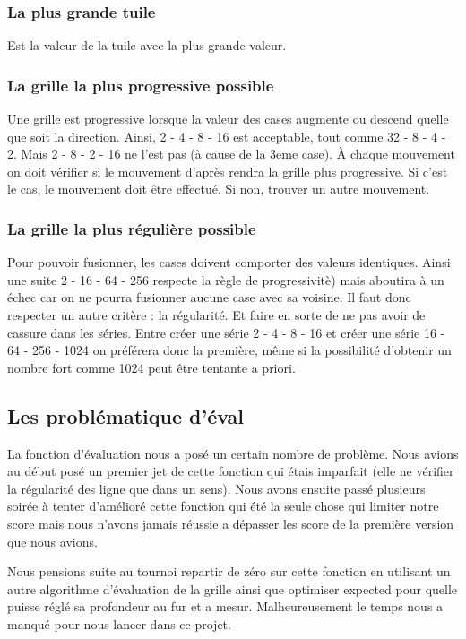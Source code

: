 \documentclass[12pt]{article}
\begin{document}
\subsubsection{La plus grande tuile} 
Est la valeur de la tuile avec la plus grande valeur.

\subsubsection{La grille la plus progressive possible}
Une grille est progressive lorsque la valeur des cases augmente ou descend
quelle que soit la direction. Ainsi, 2 - 4 - 8 - 16 est acceptable, tout comme
32 - 8 - 4 - 2. Mais 2 - 8 - 2 - 16 ne l'est pas (à cause de la 3eme case).
\`A chaque mouvement on doit vérifier si  le mouvement d'après rendra la
grille plus progressive. Si c'est le cas, le mouvement doit être effectué.
Si non, trouver un autre mouvement.

\subsubsection{La grille la plus régulière possible}
Pour pouvoir fusionner, les cases doivent comporter des valeurs identiques.
Ainsi une suite 2 - 16 - 64 - 256 respecte la règle de progressivitè) mais
aboutira à un échec car on ne pourra fusionner aucune case avec sa voisine. Il
faut donc respecter un autre critère : la régularité. Et faire en sorte de
ne pas avoir de cassure dans les séries. Entre créer une série 2 - 4 - 8 -
16 et créer une série 16 - 64 - 256 - 1024 on préférera donc la
première, même si la possibilité d'obtenir un nombre fort comme 1024 peut
être tentante a priori.

\subsection{Les problématique d'éval}
La fonction d'évaluation nous a posé un certain nombre de problème. Nous avions
au début posé un premier jet de cette fonction qui étais imparfait (elle ne vérifier la régularité des ligne que
dans un sens). Nous avons ensuite passé plusieurs soirée à tenter d’amélioré
cette fonction qui été la seule chose qui limiter notre score mais nous n'avons
jamais réussie a dépasser les score de la première version que nous avions.
\par Nous pensions suite au tournoi repartir de zéro sur cette fonction
en utilisant un autre algorithme d'évaluation de la grille ainsi que optimiser
expected pour quelle puisse réglé sa profondeur au fur et a mesur. Malheureusement
le temps nous a manqué pour nous lancer dans ce projet.
\end{document}
